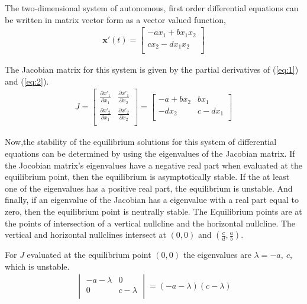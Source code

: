 \documentclass[12pt]{article}   %
\theoremstyle{definition}
\numberwithin{equation}{section}
\begin{document}
The two-dimensional system of autonomous, first order differential equations can be written in matrix vector form as a vector valued function, 
\begin{align*} 
  \textbf{x}'(t) 
  = 
  \begin{bmatrix}
    -ax_1 + bx_1x_2\\
    cx_2 - dx_1x_2\\
  \end{bmatrix}
\end{align*}

The Jacobian matrix for this system is given by the partial derivatives of (\ref{eq:1}) and (\ref{eq:2}).
\begin{align*} 
  J 
  =
  \begin{bmatrix}
    \frac{\partial{x'_1}}{\partial{x_1}} & \frac{\partial{x'_1}}{\partial{x_2}}\\
    \frac{\partial{x'_2}}{\partial{x_1}} &  \frac{\partial{x'_2}}{\partial{x_2}}\\
  \end{bmatrix}
  =
  \begin{bmatrix}
    -a+bx_2 & bx_1\\
    -dx_2 & c-dx_1\\
  \end{bmatrix}
\end{align*}

\quad Now,the stability of the equilibrium solutions for this system of differential equations can be determined by using the eigenvalues of the Jacobian matrix. If the Jocobian matrix's eigenvalues have a negative real part when evaluated at the equilibrium point, then the equilibrium is asymptotically stable. If the at least one of the eigenvalues has a positive real part, the equilibrium is unstable. And finally, if an eigenvalue of the Jacobian has a eigenvalue with a real part equal to zero, then the equilibrium point is neutrally stable. The Equilibrium points are at the points of intersection of a vertical nullcline and the horizontal nullcline. The vertical and horizontal nullclines intersect at $(0,0)$ and $(\frac{c}{d},\frac{a}{b})$.  

For $J$ evaluated at the equilibrium point $(0,0)$ the eigenvalues are $\lambda=-a,\ c$, which is unstable.
\begin{align*}
  \begin{vmatrix}
    -a-\lambda &0\\
    0& c-\lambda\\
  \end{vmatrix}
  =(-a-\lambda)(c-\lambda)
\end{align*}
\end{document}
